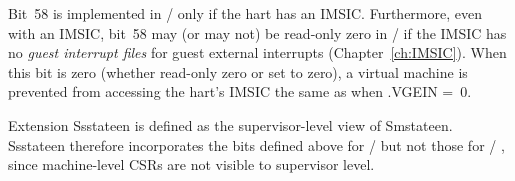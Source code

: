 Bit~58 is implemented in /
only if the hart has an IMSIC.
Furthermore, even with an IMSIC, bit~58 may (or may not) be read-only
zero in / if
the IMSIC has no \emph{guest interrupt files}
for guest external interrupts (Chapter~\ref{ch:IMSIC}).
When this bit is zero (whether read-only zero or set to zero),
a virtual machine is prevented from
accessing the hart's IMSIC the same as when .VGEIN =~0.

Extension Ssstateen is defined as
the supervisor-level view of Smstateen.
Ssstateen therefore incorporates the bits defined above
for / but not
those for / ,
since machine-level CSRs are not visible to supervisor level.

